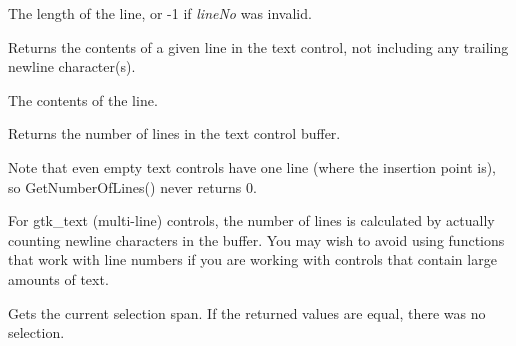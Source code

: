 


The length of the line, or -1 if {\it lineNo} was invalid.

\label{wxtextctrlgetlinetext}


Returns the contents of a given line in the text control, not including
any trailing newline character(s).




The contents of the line.

\label{wxtextctrlgetnumberoflines}


Returns the number of lines in the text control buffer.


Note that even empty text controls have one line (where the insertion point
is), so GetNumberOfLines() never returns 0.

For gtk\_text (multi-line) controls, the number of lines is
calculated by actually counting newline characters in the buffer. You
may wish to avoid using functions that work with line numbers if you are
working with controls that contain large amounts of text.

\label{wxtextctrlgetselection}


Gets the current selection span. If the returned values are equal, there was
no selection.





\label{wxtextctrlgetvalue}


